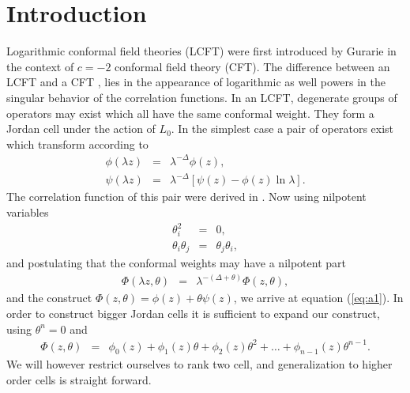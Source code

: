 \documentclass[a4paper,11pt]{article}
\begin{document}
\section{Introduction}
Logarithmic conformal field theories (LCFT) were first introduced
by Gurarie \cite{gur} in the context of $c=-2$ conformal field
theory (CFT). The difference between an LCFT and a CFT
\cite{bpz}, lies in the appearance of logarithmic as well powers
in the singular behavior of the correlation functions. In an LCFT,
degenerate groups of operators may exist which all have the same
conformal weight. They form a Jordan cell under the action of
$L_{0}$. In the simplest case a pair of operators exist which
transform according to
\begin{eqnarray}\label{eq:a1}
\phi(\lambda z)&=&\lambda^{-\Delta}\phi(z) ,\nonumber\\
\psi(\lambda z)&=&\lambda^{-\Delta}[\psi(z)-\phi(z)\ln \lambda] .
\end{eqnarray}
The correlation function of this pair were derived in
\cite{cau,rah,ghez}. Now using nilpotent variables \cite{mogh}
\begin{eqnarray}\label{eq:a2}
\theta_{i}^{2}&=&0 ,\nonumber\\
\theta_{i}\theta_{j}&=&\theta_{j}\theta_{i},
\end{eqnarray}
and  postulating that the conformal weights may have a  nilpotent
part
\begin{eqnarray}\label{eq:a3}
\Phi(\lambda z,\theta)&=&\lambda^{-(\Delta+\theta)}\Phi(z,\theta),
\end{eqnarray}
and the construct $\Phi(z,\theta)=\phi(z)+\theta \psi(z)$, we
arrive at equation (\ref{eq:a1}). In order to construct bigger
Jordan cells it is sufficient to expand our construct, using
$\theta^{n}=0$ and
\begin{eqnarray}\label{eq:a4}
\Phi(z,\theta)&=&
\phi_{0}(z)+\phi_{1}(z)\theta+\phi_{2}(z)\theta^{2}+\ldots+\phi_{n-1}(z)\theta^{n-1}.
\end{eqnarray}
We will however restrict ourselves to rank two cell, and
generalization to higher order cells is straight forward.
\end{document}
